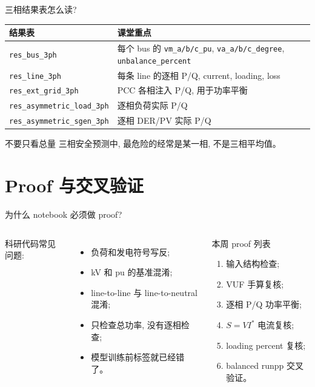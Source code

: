\documentclass[aspectratio=169,10pt]{ctexbeamer}
\newcommand{\code}[1]{\texttt{#1}}
\begin{document}
\begin{frame}{三相结果表怎么读?}
\begin{tabular}{p{}p{}}
\toprule
结果表 & 课堂重点 \\
\midrule
\code{res\_bus\_3ph} & 每个 bus 的 \code{vm\_a/b/c\_pu}, \code{va\_a/b/c\_degree}, \code{unbalance\_percent} \\
\code{res\_line\_3ph} & 每条 line 的逐相 P/Q, current, loading, loss \\
\code{res\_ext\_grid\_3ph} & PCC 各相注入 P/Q, 用于功率平衡 \\
\code{res\_asymmetric\_load\_3ph} & 逐相负荷实际 P/Q \\
\code{res\_asymmetric\_sgen\_3ph} & 逐相 DER/PV 实际 P/Q \\
\bottomrule
\end{tabular}
\vspace{0.8em}
\begin{alertblock}{不要只看总量}
三相安全预测中, 最危险的经常是某一相, 不是三相平均值。
\end{alertblock}
\end{frame}

\section{Proof 与交叉验证}

\begin{frame}{为什么 notebook 必须做 proof?}
\begin{columns}[T]
科研代码常见问题:
\begin{itemize}
  \item 负荷和发电符号写反;
  \item kV 和 pu 的基准混淆;
  \item line-to-line 与 line-to-neutral 混淆;
  \item 只检查总功率, 没有逐相检查;
  \item 模型训练前标签就已经错了。
\end{itemize}
\begin{block}{本周 proof 列表}
\begin{enumerate}
  \item 输入结构检查;
  \item VUF 手算复核;
  \item 逐相 P/Q 功率平衡;
  \item $S=VI^*$ 电流复核;
  \item loading percent 复核;
  \item balanced runpp 交叉验证。
\end{enumerate}
\end{block}
\end{columns}
\end{frame}
\end{document}
